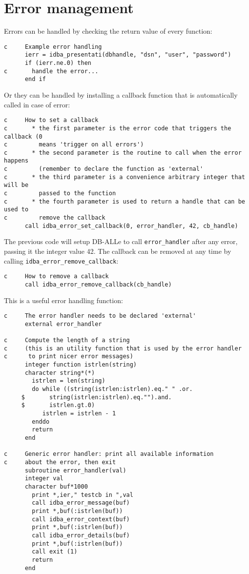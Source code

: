 \documentclass[final,12pt,a4paper,twoside]{book}
\begin{document}
\section {Error management}

Errors can be handled by checking the return value of every function:

\begin{verbatim}
c     Example error handling
      ierr = idba_presentati(dbhandle, "dsn", "user", "password")
      if (ierr.ne.0) then
c       handle the error...
      end if
\end{verbatim}

Or they can be handled by installing a callback function that is automatically
called in case of error:

\begin{verbatim}
c     How to set a callback
c       * the first parameter is the error code that triggers the callback (0
c         means 'trigger on all errors')
c       * the second parameter is the routine to call when the error happens        
c         (remember to declare the function as 'external'
c       * the third parameter is a convenience arbitrary integer that will be
c         passed to the function
c       * the fourth parameter is used to return a handle that can be used to
c         remove the callback
      call idba_error_set_callback(0, error_handler, 42, cb_handle)
\end{verbatim}

The previous code will setup DB-ALLe to call {\tt error\_handler} after any error,
passing it the integer value 42.  The callback can be removed at any time by
calling {\tt idba\_error\_remove\_callback}:
 
\begin{verbatim}
c     How to remove a callback
      call idba_error_remove_callback(cb_handle)
\end{verbatim}

This is a useful error handling function:

\begin{verbatim}
c     The error handler needs to be declared 'external'
      external error_handler

c     Compute the length of a string
c     (this is an utility function that is used by the error handler
c      to print nicer error messages)
      integer function istrlen(string)
      character string*(*)
        istrlen = len(string)
        do while ((string(istrlen:istrlen).eq." " .or.
     $       string(istrlen:istrlen).eq."").and.
     $       istrlen.gt.0)
           istrlen = istrlen - 1
        enddo
        return
      end

c     Generic error handler: print all available information
c     about the error, then exit
      subroutine error_handler(val)
      integer val
      character buf*1000
        print *,ier," testcb in ",val
        call idba_error_message(buf)
        print *,buf(:istrlen(buf))
        call idba_error_context(buf)
        print *,buf(:istrlen(buf))
        call idba_error_details(buf)
        print *,buf(:istrlen(buf))
        call exit (1)
        return
      end
\end{verbatim}
\end{document}
